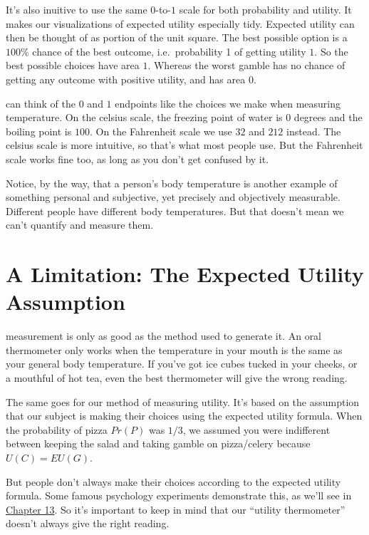 \documentclass[justified]{tufte-book}
\renewcommand{\u}{U}
\newcommand{\p}{Pr}
\newcommand{\EU}{EU}
\theoremstyle{definition}
\theoremstyle{definition}
\theoremstyle{definition}
\theoremstyle{remark}
\begin{document}
It's also inuitive to use the same \(0\)-to-\(1\) scale for both
probability and utility. It makes our visualizations of expected utility
especially tidy. Expected utility can then be thought of as portion of
the unit square. The best possible option is a \(100\%\) chance of the
best outcome, i.e.~probability 1 of getting utility \(1\). So the best
possible choices have area \(1\). Whereas the worst gamble has no chance
of getting any outcome with positive utility, and has area \(0\).

 can think of the \(0\) and \(1\) endpoints like the
choices we make when measuring temperature. On the celsius scale, the
freezing point of water is \(0\) degrees and the boiling point is
\(100\). On the Fahrenheit scale we use \(32\) and \(212\) instead. The
celsius scale is more intuitive, so that's what most people use. But the
Fahrenheit scale works fine too, as long as you don't get confused by
it.

Notice, by the way, that a person's body temperature is another example
of something personal and subjective, yet precisely and objectively
measurable. Different people have different body temperatures. But that
doesn't mean we can't quantify and measure them.

\hypertarget{a-limitation-the-expected-utility-assumption}{%
\section{A Limitation: The Expected Utility
Assumption}\label{a-limitation-the-expected-utility-assumption}}

 measurement is only as good as the method used to
generate it. An oral thermometer only works when the temperature in your
mouth is the same as your general body temperature. If you've got ice
cubes tucked in your cheeks, or a mouthful of hot tea, even the best
thermometer will give the wrong reading.

The same goes for our method of measuring utility. It's based on the
assumption that our subject is making their choices using the expected
utility formula. When the probability of pizza \(\p(P)\) was \(1/3\), we
assumed you were indifferent between keeping the salad and taking gamble
on pizza/celery because \(\u(C) = \EU(G)\).

But people don't always make their choices according to the expected
utility formula. Some famous psychology experiments demonstrate this, as
we'll see in \protect\hyperlink{challenges-to-expected-utility}{Chapter
13}. So it's important to keep in mind that our ``utility thermometer''
doesn't always give the right reading.
\end{document}
